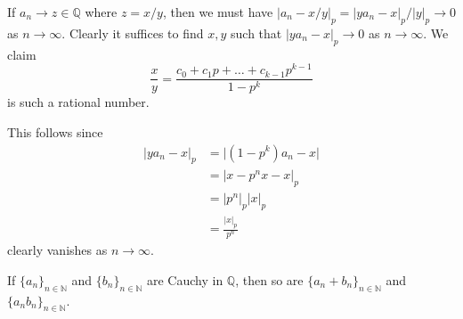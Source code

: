 \documentclass[12 pt, letterpaper]{hmcpset}
\begin{document}
\begin{solution}
	If $a_{n} \to z \in \mathbb{Q}$ where $z = x / y$, then we must have $\lvert a_{n} - x / y \rvert_{p} = \lvert y a_{n} - x \rvert_{p} / \lvert y \rvert_{p} \to 0$ as $n \to \infty$. Clearly it suffices to find $x, y$ such that $\lvert y a_{n} - x \rvert_{p} \to 0$ as $n \to \infty$. We claim
	\[
		\frac{x}{y} = \frac{c_{0} + c_{1} p + \dots + c_{k - 1} p^{k - 1}}{1 - p^{k}}
	\]
	is such a rational number.

	This follows since
	\begin{align*}
		\left \lvert y a_{n} - x \right \rvert_{p} & = \lvert (1 - p^{k}) a_{n} - x \rvert \\
							   & = \lvert x - p^{n} x - x \rvert_{p} \\
							   & = \lvert p^{n} \rvert_{p} \lvert x \rvert_{p} \\
							   & = \frac{\lvert x \rvert_{p}}{p^{n}}
	\end{align*}
	clearly vanishes as $n \to \infty$.
\end{solution}

\pagebreak

\begin{problem}[(4)]
	If $\{ a_{n} \}_{n \in \mathbb{N}}$ and $\{ b_{n} \}_{n \in \mathbb{N}}$ are Cauchy in $\mathbb{Q}$, then so are $\{ a_{n} + b_{n} \}_{n \in \mathbb{N}}$ and $\{ a_{n} b_{n} \}_{n \in \mathbb{N}}$.
\end{problem}
\end{document}
